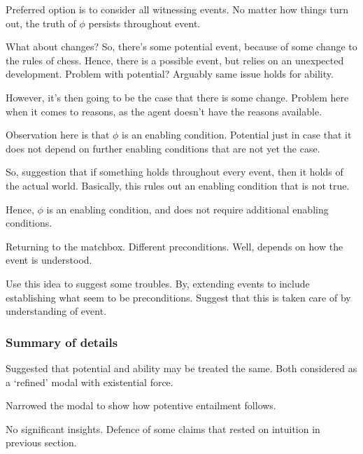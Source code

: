 \begin{note}
  Preferred option is to consider all witnessing events.
  No matter how things turn out, the truth of \(\phi\) persists throughout event.

  What about changes?
  So, there's some potential event, because of some change to the rules of chess.
  Hence, there is a possible event, but relies on an unexpected development.
  Problem with potential?
  Arguably same issue holds for ability.

  However, it's then going to be the case that there is some change.
  Problem here when it comes to reasons, as the agent doesn't have the reasons available.

  Observation here is that \(\phi\) is an enabling condition.
  Potential just in case that it does not depend on further enabling conditions that are not yet the case.


  So, suggestion that if something holds throughout every event, then it holds of the actual world.
  Basically, this rules out an enabling condition that is not true.

  Hence, \(\phi\) is an enabling condition, and does not require additional enabling conditions.
\end{note}

\begin{note}
  Returning to the matchbox.
  Different preconditions.
  Well, depends on how the event is understood.

  Use this idea to suggest some troubles.
  By, extending events to include establishing what seem to be preconditions.
  Suggest that this is taken care of by understanding of event.
\end{note}

\subsubsection{Summary of details}
\label{sec:summary-details}

\begin{note}[Seen]
  Suggested that potential and ability may be treated the same.
  Both considered as a `refined' modal with existential force.

  Narrowed the modal to show how potentive entailment follows.

  No significant insights.
  Defence of some claims that rested on intuition in previous section.
\end{note}


